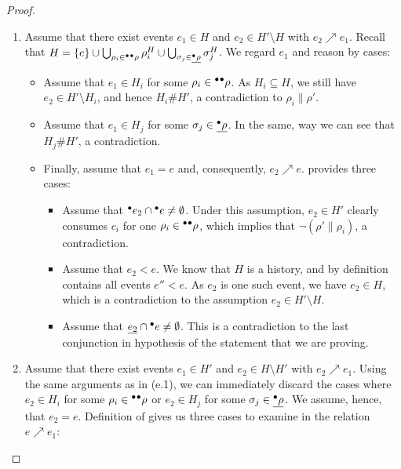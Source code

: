 \documentclass{article}
\newcommand{\confl}{\ensuremath{\mathord{\#}}}
\begin{document}
\begin{proof}
\begin{enumerate}[(a)]
\begin{enumerate}[1.]
\item Assume that there exist events $e_1 \in H$ and $e_2 \in H' \setminus H$
with $e_2 \nearrow e_1$.  Recall that $H = \{e\} \cup \bigcup_{\rho_i \in
{}^\bullet{}^\bullet\rho} \rho^H_i \cup \bigcup_{\sigma_j \in \underline{{}^\bullet\rho}}
\sigma^H_j$.  We regard $e_1$ and reason by cases:

\begin{itemize}
\item Assume that $e_1 \in H_i$ for some $\rho_i \in {}^\bullet{}^\bullet\rho$. As $H_i
\subseteq H$, we still have $e_2 \in H' \setminus H_i$, and hence $H_i \confl
H'$, a contradiction to $\rho_i \parallel \rho'$.

\item Assume that $e_1 \in H_j$ for some $\sigma_j \in \underline{{}^\bullet\rho}$.  In
the same, way we can see that $H_j \confl H'$, a contradiction.

\item Finally, assume that $e_1 = e$ and, consequently, $e_2 \nearrow e$.
 provides three cases:

\begin{itemize}
\item Assume that ${}^\bullet e_2 \cap {}^\bullet e \not= \emptyset$.  Under this
assumption, $e_2 \in H'$ clearly consumes $c_i$ for one $\rho_i \in
{}^\bullet{}^\bullet\rho$, which implies that $\lnot (\rho' \parallel \rho_i)$, a
contradiction.

\item Assume that $e_2 < e$.  We know that $H$ is a history, and by definition
contains all events $e'' < e$.  As $e_2$ is one such event, we have $e_2 \in
H$, which is a contradiction to the assumption $e_2 \in H' \setminus H$.

\item Assume that $\underline{e_2} \cap {}^\bullet e \not= \emptyset$.  This is a
contradiction to the last conjunction in hypothesis of the statement that we
are proving.
\end{itemize}
\end{itemize}

\item Assume that there exist events $e_1 \in H'$ and $e_2 \in H \setminus H'$
with $e_2 \nearrow e_1$.  Using the same arguments as in (e.1), we can
immediately discard the cases where $e_2 \in H_i$ for some $\rho_i \in
{}^\bullet{}^\bullet\rho$ or $e_2 \in H_j$ for some $\sigma_j \in \underline{{}^\bullet\rho}$.  We
assume, hence, that $e_2 = e$.  Definition of \FIXME{$\nearrow$} gives us three
cases to examine in the relation $e \nearrow e_1$:


\end{enumerate}
\end{enumerate}
\end{proof}
\end{document}
